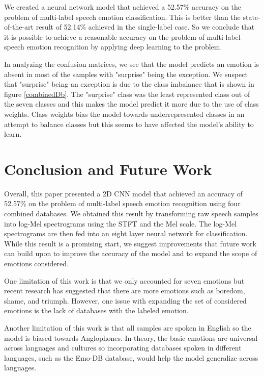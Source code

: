 \documentclass[conference]{IEEEtran}
\begin{document}
We created a neural network model that achieved a 52.57\% accuracy on the problem of multi-label speech emotion classification. This is better than the state-of-the-art result of 52.14\% achieved in the single-label case. \cite{Zhao2019} So we conclude that it is possible to achieve a reasonable accuracy on the problem of multi-label speech emotion recognition by applying deep learning to the problem. 

In analyzing the confusion matrices, we see that the model predicts an emotion is absent in most of the samples with "surprise" being the exception. We suspect that "surprise" being an exception is due to the class imbalance that is shown in figure \ref{combinedDb}. The "surprise" class was the least represented class out of the seven classes and this makes the model predict it more due to the use of class weights. Class weights bias the model towards underrepresented classes in an attempt to balance classes but this seems to have affected the model's ability to learn.

\section{Conclusion and Future Work}

Overall, this paper presented a 2D CNN model that achieved an accuracy of 52.57\% on the problem of multi-label speech emotion recognition using four combined databases. We obtained this result by transforming raw speech samples into log-Mel spectrograms using the STFT and the Mel scale. The log-Mel spectrograms are then fed into an eight layer neural network for classification. While this result is a promising start, we suggest improvements that future work can build upon to improve the accuracy of the model and to expand the scope of emotions considered.

One limitation of this work is that we only accounted for seven emotions but recent research has suggested that there are more emotions such as boredom, shame, and triumph. \cite{Cordaro2018} However, one issue with expanding the set of considered emotions is the lack of databases with the labeled emotion.

Another limitation of this work is that all samples are spoken in English so the model is biased towards Anglophones. In theory, the basic emotions are universal across languages and cultures so incorporating databases spoken in different languages, such as the Emo-DB database, would help the model generalize across languages.\cite{Burkhardt2005}
\end{document}
